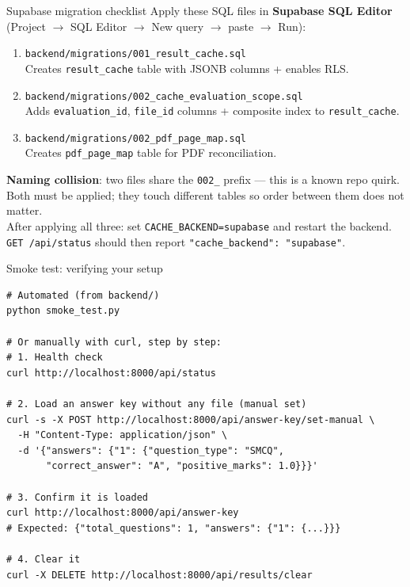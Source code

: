 \documentclass[aspectratio=169]{beamer}
\begin{document}
\begin{frame}{Supabase migration checklist}
  \footnotesize
  Apply these SQL files in \textbf{Supabase SQL Editor} (Project $\rightarrow$ SQL Editor $\rightarrow$ New query $\rightarrow$ paste $\rightarrow$ Run):
  \begin{enumerate}\setlength\itemsep{0.3em}
    \item \texttt{backend/migrations/001\_result\_cache.sql}\\
          Creates \texttt{result\_cache} table with JSONB columns + enables RLS.
    \item \texttt{backend/migrations/002\_cache\_evaluation\_scope.sql}\\
          Adds \texttt{evaluation\_id}, \texttt{file\_id} columns + composite index to \texttt{result\_cache}.
    \item \texttt{backend/migrations/002\_pdf\_page\_map.sql}\\
          Creates \texttt{pdf\_page\_map} table for PDF reconciliation.
  \end{enumerate}
  \textbf{Naming collision}: two files share the \texttt{002\_} prefix --- this is a known repo quirk.
  Both must be applied; they touch different tables so order between them does not matter.\\[0.3em]
  After applying all three: set \texttt{CACHE\_BACKEND=supabase} and restart the backend.
  \texttt{GET /api/status} should then report \texttt{"cache\_backend": "supabase"}.
\end{frame}

\begin{frame}[fragile]{Smoke test: verifying your setup}
\begin{lstlisting}[style=pys]
# Automated (from backend/)
python smoke_test.py

# Or manually with curl, step by step:
# 1. Health check
curl http://localhost:8000/api/status

# 2. Load an answer key without any file (manual set)
curl -s -X POST http://localhost:8000/api/answer-key/set-manual \
  -H "Content-Type: application/json" \
  -d '{"answers": {"1": {"question_type": "SMCQ",
       "correct_answer": "A", "positive_marks": 1.0}}}'

# 3. Confirm it is loaded
curl http://localhost:8000/api/answer-key
# Expected: {"total_questions": 1, "answers": {"1": {...}}}

# 4. Clear it
curl -X DELETE http://localhost:8000/api/results/clear
\end{lstlisting}
\end{frame}
\end{document}
